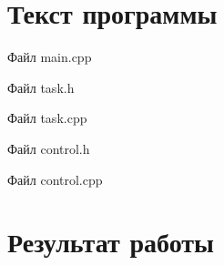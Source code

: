 \documentclass[14pt, a4paper]{extreport}
\begin{document}
\chapter{Текст программы}

\noindent Файл main.cpp

\pagebreak
\hrulefill

\noindent Файл task.h

\hrulefill

\noindent Файл task.cpp

\hrulefill

\noindent Файл control.h

\hrulefill

\noindent Файл control.cpp


\chapter{Результат работы}
\end{document}
